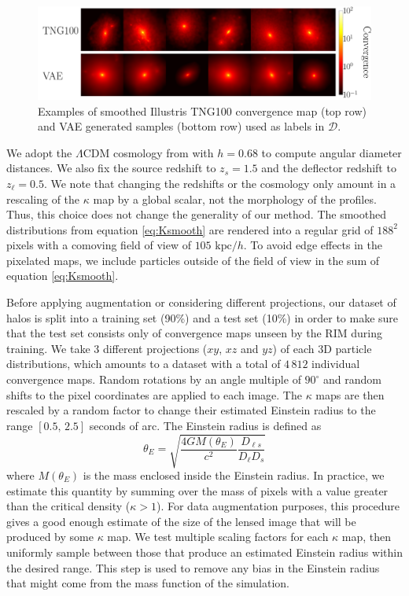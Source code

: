 \begin{figure}[t!]
        \centering
        \includegraphics[width=0.7\linewidth]{figures/kap_vae_sample}
        \caption{Examples of smoothed Illustris TNG100 convergence map (top row) 
        and VAE generated samples (bottom row) used as labels in $\mathcal{D}$.}
        \label{fig:kappa}
\end{figure}

We adopt the $\Lambda$CDM cosmology from 
\citet{PlanckCollaboration2018} with $h=0.68$ to compute 
angular diameter distances. We also fix the 
source redshift to $z_s=1.5$ and the deflector redshift to $z_\ell=0.5$. 
We note that changing the redshifts or the cosmology 
only amount in a rescaling of the $\kappa$ map by a global scalar, not 
the morphology of the profiles. Thus, this choice does not change the generality of our method.
The smoothed distributions from equation \eqref{eq:Ksmooth} are 
rendered into a regular grid of $188^2$ pixels with a comoving field of view of $105\,\,\mathrm{kpc}/h$. 
To avoid 
edge effects in the pixelated maps, 
we include particles outside of the field of view in the sum of equation \eqref{eq:Ksmooth}.
\par
Before applying augmentation or considering different projections, our dataset of halos is split into a 
training set (90\%) and a test set (10\%) in order to make sure that the test set consists only 
of convergence maps unseen by the RIM during training.
We take 3 different projections ($xy$, $xz$ and $yz$) of each 3D particle 
distributions, which amounts to a dataset with a total of $4\,812$ individual convergence maps. 
Random rotations by an angle multiple of $90^{\circ}$ and random shifts to the pixel coordinates 
are applied to each image. The $\kappa$ maps are then rescaled by a random factor to change their 
estimated Einstein radius to the range 
$[0.5,\,2.5]$ seconds of arc.
The Einstein radius is defined as
\begin{equation}\label{eq:ThetaE}
        \theta_E = \sqrt{\frac{4GM(\theta_E)}{c^ 2} \frac{D_{\ell s}}{D_\ell D_s}}
\end{equation} 
where $M(\theta_E)$ is the mass enclosed inside the Einstein radius. In practice, we estimate this quantity 
by summing over the mass of pixels with a value greater than the critical density ($\kappa > 1$). 
For data augmentation purposes, this procedure gives a good enough estimate of the 
size of the lensed image that will be produced by some $\kappa$ map. 
We test multiple scaling factors for each $\kappa$ map, then uniformly sample between those that produce an estimated 
Einstein radius within the 
desired range. This step is used to remove any bias in the Einstein radius that might come from the mass function 
of the simulation.

